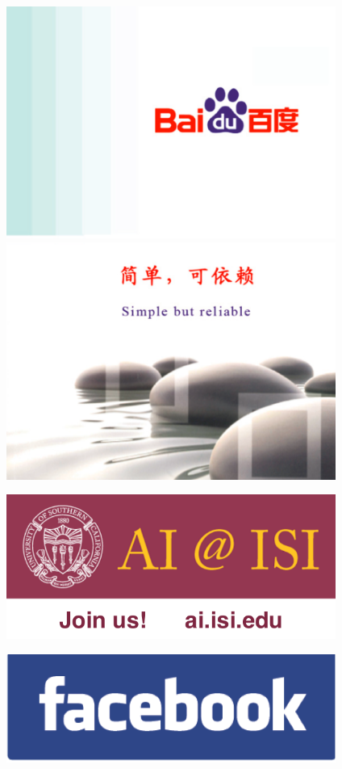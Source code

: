 \clearpage
\thispagestyle{empty}

\includegraphics[width=4.25in]{content/ads/Baidu-top.PNG}
\includegraphics[width=4.25in]{content/ads/Baidu-bottom.PNG}

\newpage
\thispagestyle{empty}

\includegraphics[width=4.25in]{content/ads/silver/ISI-Ad-silver.pdf}

\vfill

\includegraphics[width=4.25in]{content/ads/bronze/facebook.png}

